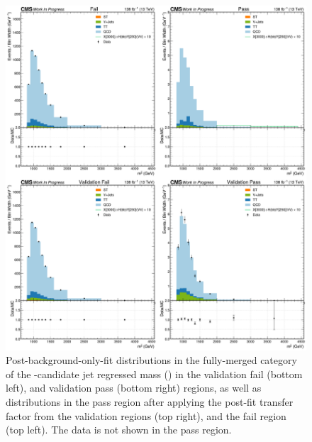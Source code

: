 \begin{figure}[hbt!]
\centering
\includegraphics[width=\textwidth]{figures/05-HH/results_res/postfit_DijetMass.pdf}
\caption[Post-background-only-fit distributions in the fully-merged category of the \VV-candidate jet regressed mass (\mregvv).]{Post-background-only-fit distributions in the fully-merged category of the \VV-candidate jet regressed mass (\mregvv) in the validation fail (bottom left), and validation pass (bottom right) regions, as well as distributions in the pass region after applying the post-fit transfer factor from the validation regions (top right), and the fail region (top left).
The data is not shown in the pass region. 
\label{fig:05_results_xhy_postfit_fm_mvv}
}
\end{figure}

